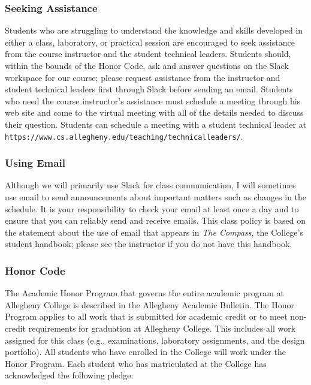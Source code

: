 \documentclass[11pt]{article}
\newcommand{\instructorpronoun}[1]{his}
\newcommand{\url}[1]{\lstinline{#1}}
\begin{document}
\vspace*{-.05in}

\subsubsection*{Seeking Assistance}

Students who are struggling to understand the knowledge and skills developed in
either a class, laboratory, or practical session are encouraged to seek
assistance from the course instructor and the student technical leaders.
Students should, within the bounds of the Honor Code, ask and answer questions
on the Slack workspace for our course; please request assistance from the
instructor and student technical leaders first through Slack before sending an
email. Students who need the course instructor's assistance must schedule a
meeting through \instructorpronoun{} web site and come to the virtual meeting
with all of the details needed to discuss their question. Students can schedule
a meeting with a student technical leader at
\url{https://www.cs.allegheny.edu/teaching/technicalleaders/}.

\vspace*{-.05in}

\subsubsection*{Using Email}

Although we will primarily use Slack for class communication, I will sometimes
use email to send announcements about important matters such as changes in the
schedule. It is your responsibility to check your email at least once a day and
to ensure that you can reliably send and receive emails. This class policy is
based on the statement about the use of email that appears in {\em The Compass},
the College's student handbook; please see the instructor if you do not have
this handbook.

\vspace*{-.1in}

\subsubsection*{Honor Code}

The Academic Honor Program that governs the entire academic program at Allegheny
College is described in the Allegheny Academic Bulletin. The Honor Program
applies to all work that is submitted for academic credit or to meet non-credit
requirements for graduation at Allegheny College. This includes all work
assigned for this class (e.g., examinations, laboratory assignments, and the
design portfolio). All students who have enrolled in the College will work under
the Honor Program. Each student who has matriculated at the College has
acknowledged the following pledge:
\end{document}
